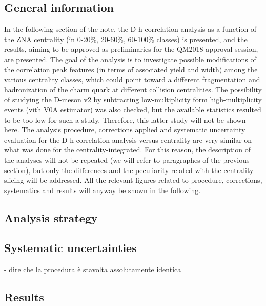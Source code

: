 \subsection{General information}
In the following section of the note, the D-h correlation analysis as a function of the ZNA centrality (in 0-20\%, 20-60\%, 60-100\% classes) is presented, and the results, aiming to be approved as preliminaries for the QM2018 approval session, are presented.
The goal of the analysis is to investigate possible modifications of the correlation peak features (in terms of associated yield and width) among the various centrality classes, which could point toward a different fragmentation and hadronization of the charm quark at different collision centralities.
The possibility of studying the D-meson v2 by subtracting low-multiplicity form high-multiplicity events (vith V0A estimator) was also checked, but the available statistics resulted to be too low for such a study. Therefore, this latter study will not be shown here.
The analysis procedure, corrections applied and systematic uncertainty evaluation for the D-h correlation analysis versus centrality are very similar on what was done for the centrality-integrated. For this reason, the description of the analyses will not be repeated (we will refer to paragraphes of the previous section), but only the differences and the peculiarity related with the centrality slicing will be addressed.
All the relevant figures related to procedure, corrections, systematics and results will anyway be shown in the following.

\subsection{Analysis strategy}


\subsection{Systematic uncertainties}
- dire che la procedura è stavolta assolutamente identica


\subsection{Results}


